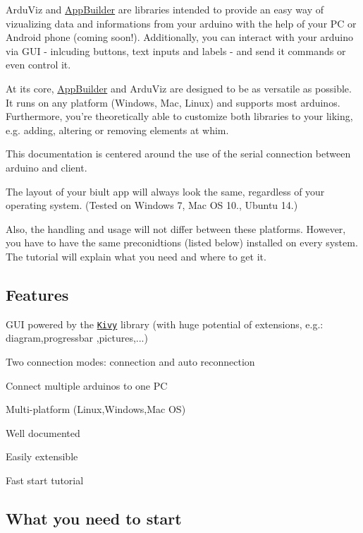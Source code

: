 Ardu\+Viz and \hyperlink{class_app_builder}{App\+Builder} are libraries intended to provide an easy way of vizualizing data and informations from your arduino with the help of your P\+C or Android phone (coming soon!). Additionally, you can interact with your arduino via G\+U\+I -\/ inlcuding buttons, text inputs and labels -\/ and send it commands or even control it.

At its core, \hyperlink{class_app_builder}{App\+Builder} and Ardu\+Viz are designed to be as versatile as possible. It runs on any platform (Windows, Mac, Linux) and supports most arduinos. Furthermore, you're theoretically able to customize both libraries to your liking, e.\+g. adding, altering or removing elements at whim.

This documentation is centered around the use of the serial connection between arduino and client.

  

The layout of your biult app will always look the same, regardless of your operating system. (Tested on Windows 7, Mac O\+S 10., Ubuntu 14.)

Also, the handling and usage will not differ between these platforms. However, you have to have the same preconidtions (listed below) installed on every system. The tutorial will explain what you need and where to get it.

\subsection*{Features}


\begin{DoxyItemize}
\item G\+U\+I powered by the \href{http://kivy.org}{\tt Kivy} library (with huge potential of extensions, e.\+g.\+: diagram,progressbar ,pictures,...)
\item Two connection modes\+: connection and auto reconnection
\item Connect multiple arduinos to one P\+C
\item Multi-\/platform (Linux,Windows,Mac O\+S)
\item Well documented
\item Easily extensible
\item Fast start tutorial
\end{DoxyItemize}

\subsection*{What you need to start}



